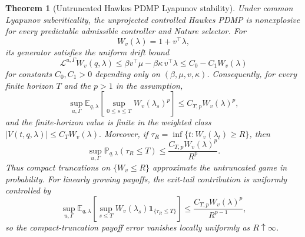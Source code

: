 \documentclass[11pt]{article}
\newtheorem{theorem}{Theorem}
\newcommand{\E}{\mathbb{E}}
\begin{document}
\begin{theorem}[Untruncated Hawkes PDMP Lyapunov stability]
Under common Lyapunov subcriticality, the unprojected controlled Hawkes PDMP is
nonexplosive for every predictable admissible controller and Nature selector.
For
\[
W_v(\lambda)=1+v^\top\lambda,
\]
its generator satisfies the uniform drift bound
\[
\mathcal L^{u,\Gamma}W_v(q,\lambda)
\le
\beta v^\top\mu-\beta\kappa\, v^\top\lambda
\le C_0-C_1 W_v(\lambda)
\]
for constants $C_0,C_1>0$ depending only on
$(\beta,\mu,v,\kappa)$. Consequently, for every finite horizon $T$ and the
$p>1$ in the assumption,
\[
\sup_{u,\Gamma}\E_{q,\lambda}\left[\sup_{0\le s\le T} W_v(\lambda_s)^p\right]
\le C_{T,p} W_v(\lambda)^p,
\]
and the finite-horizon value is finite in the weighted class
$
|V(t,q,\lambda)|\le C_T W_v(\lambda).
$
Moreover, if $\tau_R=\inf\{t:W_v(\lambda_t)\ge R\}$, then
\[
\sup_{u,\Gamma}\mathbb P_{q,\lambda}(\tau_R\le T)
\le \frac{C_{T,p} W_v(\lambda)^p}{R^p}.
\]
Thus compact truncations on $\{W_v\le R\}$ approximate the untruncated game in
probability. For linearly growing payoffs, the exit-tail contribution is
uniformly controlled by
\[
\sup_{u,\Gamma}
\E_{q,\lambda}\!\left[
\sup_{s\le T}W_v(\lambda_s)\mathbf 1_{\{\tau_R\le T\}}
\right]
\le
\frac{C_{T,p}W_v(\lambda)^p}{R^{p-1}},
\]
so the compact-truncation payoff error vanishes locally uniformly as
$R\uparrow\infty$.
\end{theorem}
\end{document}
